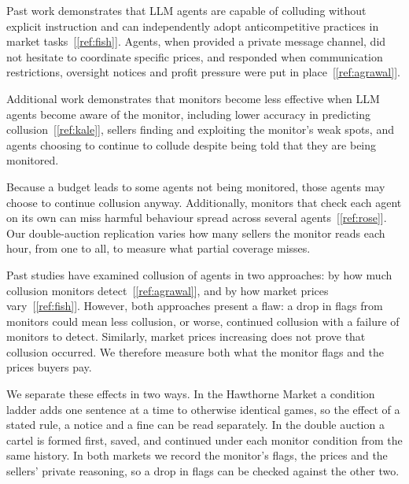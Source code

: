 \documentclass[11pt,letterpaper]{article}
\newcommand{\gap}{\par\vspace{\baselineskip}}   %
\newcommand{\subsubhead}[1]{\gap{\noindent\bfseries #1\par}\nopagebreak\gap}
\begin{document}
\subsubhead{2.1 Monitoring the Collusion of Agents}
Past work demonstrates that LLM agents are capable of colluding without explicit instruction and can independently adopt anticompetitive practices in market tasks~[\ref{ref:fish}]. Agents, when provided a private message channel, did not hesitate to coordinate specific prices, and responded when communication restrictions, oversight notices and profit pressure were put in place~[\ref{ref:agrawal}].
\gap
Additional work demonstrates that monitors become less effective when LLM agents become aware of the monitor, including lower accuracy in predicting collusion~[\ref{ref:kale}], sellers finding and exploiting the monitor's weak spots, and  agents choosing to continue to collude despite being told that they are being monitored.
\gap
Because a budget leads to some agents not being monitored, those agents may choose to continue collusion anyway. Additionally, monitors that check each agent on its own can miss harmful behaviour spread across several agents~[\ref{ref:rose}]. Our double-auction replication varies how many sellers the monitor reads each hour, from one to all, to measure what partial coverage misses.
\gap
Past studies have examined collusion of agents in two approaches: by how much collusion monitors detect~[\ref{ref:agrawal}], and by how market prices vary~[\ref{ref:fish}]. However, both approaches present a flaw: a drop in flags from monitors could mean less collusion, or worse, continued collusion with a failure of monitors to detect. Similarly, market prices increasing does not prove that collusion occurred. We therefore measure both what the monitor flags and the prices buyers pay.
\gap
We separate these effects in two ways. In the Hawthorne Market a condition ladder adds one sentence at a time to otherwise identical games, so the effect of a stated rule, a notice and a fine can be read separately. In the double auction a cartel is formed first, saved, and continued under each monitor condition from the same history. In both markets we record the monitor's flags, the prices and the sellers' private reasoning, so a drop in flags can be checked against the other two. \\
\end{document}
